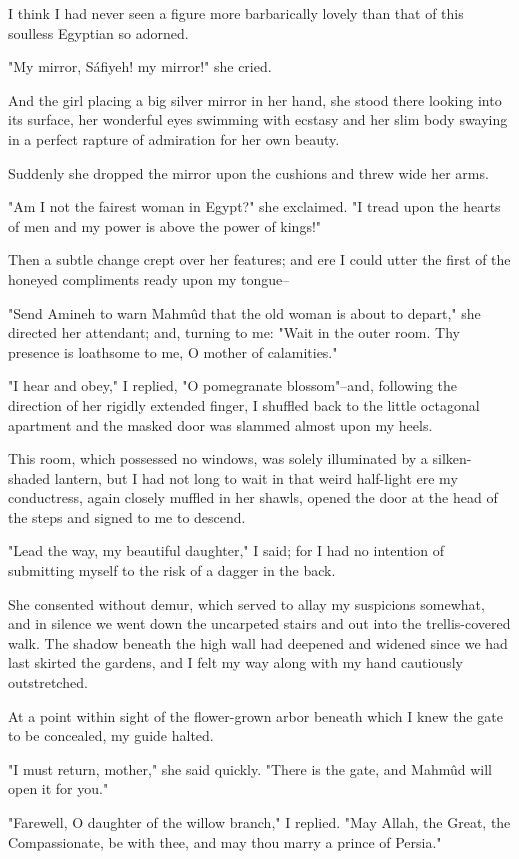 I think I had never seen a figure more barbarically lovely than that
of this soulless Egyptian so adorned.

"My mirror, Sáfiyeh! my mirror!" she cried.

And the girl placing a big silver mirror in her hand, she stood there
looking into its surface, her wonderful eyes swimming with ecstasy and
her slim body swaying in a perfect rapture of admiration for her own
beauty.

Suddenly she dropped the mirror upon the cushions and threw wide her
arms.

"Am I not the fairest woman in Egypt?" she exclaimed. "I tread upon
the hearts of men and my power is above the power of kings!"

Then a subtle change crept over her features; and ere I could utter
the first of the honeyed compliments ready upon my tongue--

"Send Amineh to warn Mahmûd that the old woman is about to depart,"
she directed her attendant; and, turning to me: "Wait in the outer
room. Thy presence is loathsome to me, O mother of calamities."

"I hear and obey," I replied, "O pomegranate blossom"--and, following
the direction of her rigidly extended finger, I shuffled back to the
little octagonal apartment and the masked door was slammed almost upon
my heels.

This room, which possessed no windows, was solely illuminated by a
silken-shaded lantern, but I had not long to wait in that weird
half-light ere my conductress, again closely muffled in her shawls,
opened the door at the head of the steps and signed to me to descend.

"Lead the way, my beautiful daughter," I said; for I had no intention
of submitting myself to the risk of a dagger in the back.

She consented without demur, which served to allay my suspicions
somewhat, and in silence we went down the uncarpeted stairs and out
into the trellis-covered walk. The shadow beneath the high wall had
deepened and widened since we had last skirted the gardens, and I
felt my way along with my hand cautiously outstretched.

At a point within sight of the flower-grown arbor beneath which I
knew the gate to be concealed, my guide halted.

"I must return, mother," she said quickly. "There is the gate, and
Mahmûd will open it for you."

"Farewell, O daughter of the willow branch," I replied. "May Allah,
the Great, the Compassionate, be with thee, and may thou marry a
prince of Persia."

